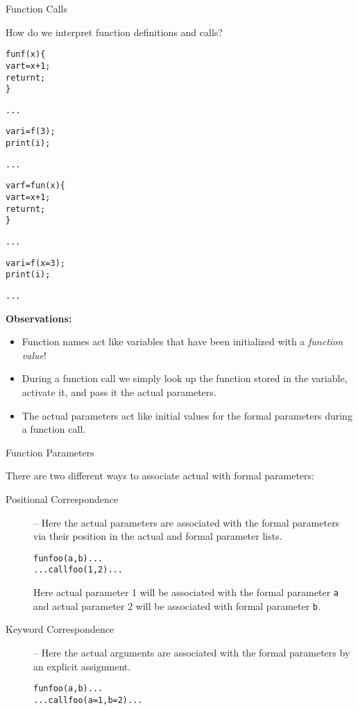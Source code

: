 \documentclass{beamer}
\begin{document}
\begin{frame}[fragile]{Function Calls}

\scriptsize
How do we interpret function definitions and calls?

\vspace{.1in}

\begin{minipage}{2.2in}
\begin{alltt}\scriptsize
fun f (x) \{
    var t = x + 1;
    return t;
\}

...

var i = f(3);
print(i);

...

\end{alltt}
\end{minipage}
\begin{minipage}{1.4in}
\begin{alltt}\scriptsize
var f = fun (x) \{
    var t = x + 1;
    return t;
\}

...

var i = f (x = 3);
print(i);

...

\end{alltt}
\end{minipage}
{\bf Observations:}
\begin{itemize}
\item Function names act like variables that have been initialized with a {\em function value}!
\item During a function call we simply look up the function stored in the variable, activate it,
and pass it the actual parameters.
\item The actual parameters act like initial values for the formal parameters during a
function call.
\end{itemize}
\end{frame}

\begin{frame}[fragile]{Function Parameters}

\small

There are two different ways to associate actual with formal parameters:
\begin{description}
\item[Positional Correspondence] -- Here the actual parameters are associated with the formal parameters  via their position in the actual and formal parameter lists.\\
\begin{alltt}
fun foo(a,b) ...
... call foo(1,2)...
\end{alltt}
Here actual parameter 1 will be associated with the formal parameter {\tt a} and actual parameter 2 will be associated with formal parameter {\tt b}.
\item[Keyword Correspondence] -- Here the actual arguments are associated with the formal parameters by an explicit assignment.
\begin{alltt}
fun foo(a,b) ...
... call foo(a=1,b=2)...
\end{alltt}
\end{description}
\end{frame}
\end{document}

